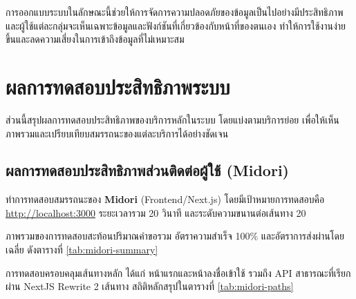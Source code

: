 \hspace*{1.5em}
การออกแบบระบบในลักษณะนี้ช่วยให้การจัดการความปลอดภัยของข้อมูลเป็นไปอย่างมีประสิทธิภาพ และผู้ใช้แต่ละกลุ่มจะเห็นเฉพาะข้อมูลและฟังก์ชันที่เกี่ยวข้องกับหน้าที่ของตนเอง ทำให้การใช้งานง่ายขึ้นและลดความเสี่ยงในการเข้าถึงข้อมูลที่ไม่เหมาะสม

\section{ผลการทดสอบประสิทธิภาพระบบ}
\label{sec:system-perf}
\hspace*{1.5em}
ส่วนนี้สรุปผลการทดสอบประสิทธิภาพของบริการหลักในระบบ โดยแบ่งตามบริการย่อย เพื่อให้เห็นภาพรวมและเปรียบเทียบสมรรถนะของแต่ละบริการได้อย่างชัดเจน

\subsection{ผลการทดสอบประสิทธิภาพส่วนติดต่อผู้ใช้ (Midori)}
\label{sec:midori-perf}
\hspace*{1.5em}
ทำการทดสอบสมรรถนะของ \textbf{Midori} (Frontend/Next.js) โดยมีเป้าหมายการทดสอบคือ \url{http://localhost:3000} ระยะเวลารวม 20 วินาที และระดับความขนานต่อเส้นทาง 20

\hspace*{1.5em}
ภาพรวมของการทดสอบสะท้อนปริมาณคำขอรวม อัตราความสำเร็จ 100\% และอัตราการส่งผ่านโดยเฉลี่ย ดังตารางที่ \ref{tab:midori-summary}

\begin{table}[htbp]
    \centering
    \caption{}
    \label{tab:midori-summary}
\end{table}

\hspace*{1.5em}
การทดสอบครอบคลุมเส้นทางหลัก ได้แก่ หน้าแรกและหน้าลงชื่อเข้าใช้ รวมถึง API สาธารณะที่เรียกผ่าน NextJS Rewrite 2 เส้นทาง สถิติหลักสรุปในตารางที่ \ref{tab:midori-paths}

